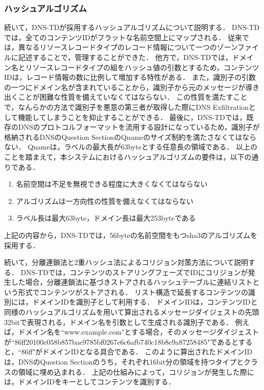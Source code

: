 \subsubsection{ハッシュアルゴリズム}
続いて，DNS-TDが採用するハッシュアルゴリズムについて説明する．
DNS-TDでは，全てのコンテンツIDがフラットな名前空間上にマップされる．
従来では，異なるリソースレコードタイプのレコード情報について一つのゾーンファイルに記述することで，管理することができた．
他方で，DNS-TDでは，ドメイン名とリソースレコードタイプの組をハッシュ値の引数とするため，コンテンツIDは，レコード情報の数に比例して増加する特性がある．
また，識別子の引数の一つにドメイン名が含まれていることから，識別子から元のメッセージが導き出くことが困難な性質を備えていなくてはならない．
この性質を満たすことで，なんらかの方法で識別子を悪意の第三者が取得した際にDNS Exfiltrationとして機能してしまうことを抑止することができる．
最後に，DNS-TDでは，既存のDNSのプロトコルフォーマットを流用する設計になっているため，識別子が格納されるDNSのQuestion SectionのQnameのサイズ制約を満たさなくてはならない．
Qnameは，ラベルの最大長が63byteとする任意長の領域である．
以上のことを踏まえて，本システムにおけるハッシュアルゴリズムの要件は，以下の通りである．

\begin{enumerate}
 \item 名前空間は不足を無視できる程度に大きくなくてはならない
 \vspace{-3mm}
 \item アルゴリズムは一方向性の性質を備えなくてはならない
 \vspace{-3mm}
 \item ラベル長は最大63byte，ドメイン長は最大253byteである
 \vspace{-3mm}
\end{enumerate}


上記の内容から，DNS-TDでは，56byteの名前空間をもつsha3のアルゴリズムを採用する．

続いて，分離連鎖法と2重ハッシュ法によるコリジョン対策方法について説明する．
DNS-TDでは，コンテンツのストアリングフェーズでIDにコリジョンが発生した場合，分離連鎖法に基づきストアされるハッシュテーブルに連結リストという形式でコンテンツがストアされる．
リスト構造で延長するコンテンツの識別には，ドメインIDを識別子として利用する．
ドメインIDは，コンテンツIDと同様のハッシュアルゴリズムを用いて算出されるメッセージダイジェストの先頭32bitで表現される，ドメイン名を引数として生成される識別子である．
例えば，ドメイン名を``www.example.com"とする場合，そのメッセージダイジェストが``86ff20100c058b857bae9785bf0267e6c6afb740c18b8e9a87258485"であるとすると，``86ff"がドメインIDとなる具合である．
このように算出されたドメインIDは，DNSのQuestion Sectionのうち，それぞれ16bit分の領域を持つタイプとクラスの領域に埋め込まれる．
上記の仕組みによって，コリジョンが発生した際には，ドメインIDをキーとしてコンテンツを識別する．


